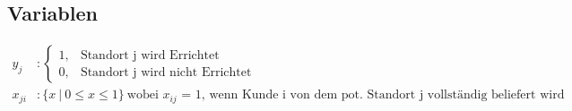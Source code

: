 \documentclass[a4paper,11pt]{article}
\begin{document}
\subsection*{Variablen}
\begin{align*}
    y_j &: \begin{cases}
        1, & \text{Standort j wird Errichtet} \\
        0, & \text{Standort j wird nicht Errichtet}
    \end{cases} \\
    x_{ji} &: \{ x ~|~ 0 \le x \le 1 \} ~\text{wobei $x_{ij}$ = 1, wenn Kunde i von dem pot. Standort j vollständig beliefert wird} \\
\end{align*}
\end{document}
